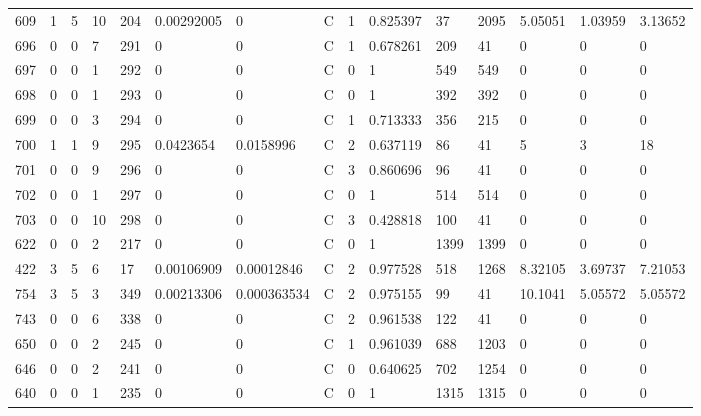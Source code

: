 \begin{latin}
\begin{longtable}{lllllllllllllll}
	609 & 1  & 5   & 10 & 204 & 0.00292005     & 0              & C & 1  & 0.825397 & 37   & 2095 & 5.05051 & 1.03959 & 3.13652 \\
	696 & 0  & 0   & 7  & 291 & 0              & 0              & C & 1  & 0.678261 & 209  & 41   & 0       & 0       & 0       \\
	697 & 0  & 0   & 1  & 292 & 0              & 0              & C & 0  & 1        & 549  & 549  & 0       & 0       & 0       \\
	698 & 0  & 0   & 1  & 293 & 0              & 0              & C & 0  & 1        & 392  & 392  & 0       & 0       & 0       \\
	699 & 0  & 0   & 3  & 294 & 0              & 0              & C & 1  & 0.713333 & 356  & 215  & 0       & 0       & 0       \\
	700 & 1  & 1   & 9  & 295 & 0.0423654      & 0.0158996      & C & 2  & 0.637119 & 86   & 41   & 5       & 3       & 18      \\
	701 & 0  & 0   & 9  & 296 & 0              & 0              & C & 3  & 0.860696 & 96   & 41   & 0       & 0       & 0       \\
	702 & 0  & 0   & 1  & 297 & 0              & 0              & C & 0  & 1        & 514  & 514  & 0       & 0       & 0       \\
	703 & 0  & 0   & 10 & 298 & 0              & 0              & C & 3  & 0.428818 & 100  & 41   & 0       & 0       & 0       \\
	622 & 0  & 0   & 2  & 217 & 0              & 0              & C & 0  & 1        & 1399 & 1399 & 0       & 0       & 0       \\
	422 & 3  & 5   & 6  & 17  & 0.00106909     & 0.00012846     & C & 2  & 0.977528 & 518  & 1268 & 8.32105 & 3.69737 & 7.21053 \\
	754 & 3  & 5   & 3  & 349 & 0.00213306     & 0.000363534    & C & 2  & 0.975155 & 99   & 41   & 10.1041 & 5.05572 & 5.05572 \\
	743 & 0  & 0   & 6  & 338 & 0              & 0              & C & 2  & 0.961538 & 122  & 41   & 0       & 0       & 0       \\
	650 & 0  & 0   & 2  & 245 & 0              & 0              & C & 1  & 0.961039 & 688  & 1203 & 0       & 0       & 0       \\
	646 & 0  & 0   & 2  & 241 & 0              & 0              & C & 0  & 0.640625 & 702  & 1254 & 0       & 0       & 0       \\
	640 & 0  & 0   & 1  & 235 & 0              & 0              & C & 0  & 1        & 1315 & 1315 & 0       & 0       & 0       \\

\end{longtable}
\end{latin}
